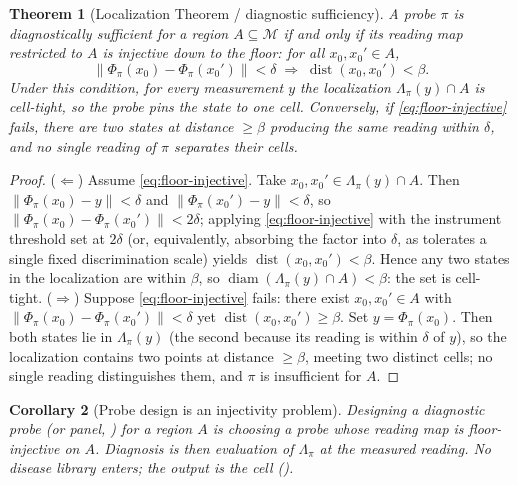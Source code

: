 \documentclass[11pt,a4paper]{article}
\theoremstyle{cfcthm}
\newtheorem{theorem}{Theorem}[section]
\newtheorem{corollary}[theorem]{Corollary}
\theoremstyle{definition}
\theoremstyle{remark}
\newcommand{\Man}{\mathcal{M}}          %
\newcommand{\st}{x}                     %
\newcommand{\flo}{\beta}                %
\newcommand{\probe}{\pi}                %
\newcommand{\fwd}{\Phi}                 %
\newcommand{\loc}{\Lambda}              %
\newcommand{\norm}[1]{\lVert#1\rVert}
\newcommand{\diam}{\operatorname{diam}}
\newcommand{\dist}{\operatorname{dist}}
\begin{document}
\begin{theorem}[Localization Theorem / diagnostic sufficiency]
\label{thm:localization}
A probe $\probe$ is \emph{diagnostically sufficient} for a region
$A\subseteq\Man$ if and only if its reading map restricted to $A$ is injective
down to the floor: for all $\st_0,\st_0'\in A$,
\begin{equation}
\norm{\fwd_\probe(\st_0)-\fwd_\probe(\st_0')}<\delta
\;\Longrightarrow\;\dist(\st_0,\st_0')<\flo.
\label{eq:floor-injective}
\end{equation}
Under this condition, for every measurement $y$ the localization
$\loc_\probe(y)\cap A$ is cell-tight, so the probe pins the state to one cell.
Conversely, if \eqref{eq:floor-injective} fails, there are two states at
distance $\ge\flo$ producing the same reading within $\delta$, and no single
reading of $\probe$ separates their cells.
\end{theorem}

\begin{proof}
($\Leftarrow$) Assume \eqref{eq:floor-injective}. Take
$\st_0,\st_0'\in\loc_\probe(y)\cap A$. Then
$\norm{\fwd_\probe(\st_0)-y}<\delta$ and $\norm{\fwd_\probe(\st_0')-y}<\delta$,
so $\norm{\fwd_\probe(\st_0)-\fwd_\probe(\st_0')}<2\delta$; applying
\eqref{eq:floor-injective} with the instrument threshold set at $2\delta$ (or,
equivalently, absorbing the factor into $\delta$, as 
tolerates a single fixed discrimination scale) yields
$\dist(\st_0,\st_0')<\flo$. Hence any two states in the localization are within
$\flo$, so $\diam(\loc_\probe(y)\cap A)<\flo$: the set is cell-tight.
($\Rightarrow$) Suppose \eqref{eq:floor-injective} fails: there exist
$\st_0,\st_0'\in A$ with
$\norm{\fwd_\probe(\st_0)-\fwd_\probe(\st_0')}<\delta$ yet
$\dist(\st_0,\st_0')\ge\flo$. Set $y=\fwd_\probe(\st_0)$. Then both states lie
in $\loc_\probe(y)$ (the second because its reading is within $\delta$ of $y$),
so the localization contains two points at distance $\ge\flo$, meeting two
distinct cells; no single reading distinguishes them, and $\probe$ is
insufficient for $A$.
\end{proof}

\begin{corollary}[Probe design is an injectivity problem]
\label{cor:design}
Designing a diagnostic probe (or panel, ) for a region $A$ is
choosing a probe whose reading map is floor-injective on $A$. Diagnosis is then
evaluation of $\loc_\probe$ at the measured reading. No disease library enters;
the output is the cell ().
\end{corollary}
\end{document}
